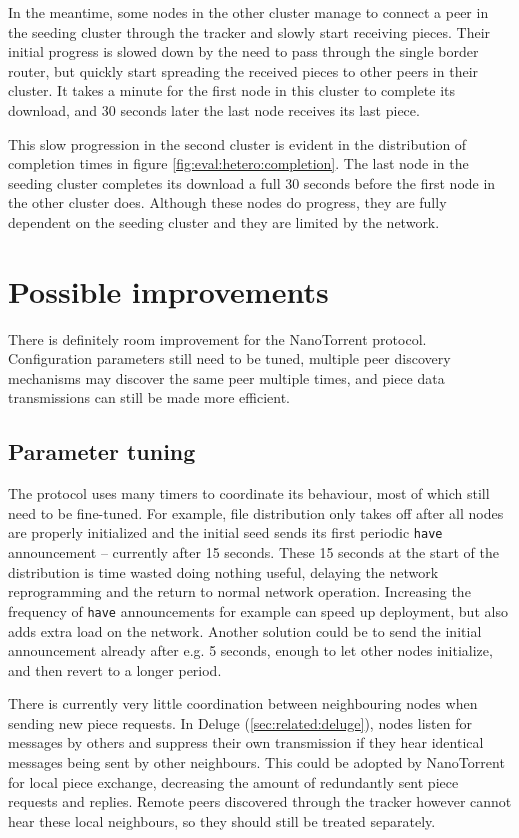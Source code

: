 In the meantime, some nodes in the other cluster manage to connect a peer in the seeding cluster through the tracker and slowly start receiving pieces. Their initial progress is slowed down by the need to pass through the single border router, but quickly start spreading the received pieces to other peers in their cluster. It takes a minute for the first node in this cluster to complete its download, and 30 seconds later the last node receives its last piece.

This slow progression in the second cluster is evident in the distribution of completion times in figure \ref{fig:eval:hetero:completion}. The last node in the seeding cluster completes its download a full 30 seconds before the first node in the other cluster does. Although these nodes do progress, they are fully dependent on the seeding cluster and they are limited by the network.

\section{Possible improvements}
\label{sec:eval:improvements}
There is definitely room improvement for the NanoTorrent protocol. Configuration parameters still need to be tuned, multiple peer discovery mechanisms may discover the same peer multiple times, and piece data transmissions can still be made more efficient.

\subsection{Parameter tuning}
The protocol uses many timers to coordinate its behaviour, most of which still need to be fine-tuned. For example, file distribution only takes off after all nodes are properly initialized and the initial seed sends its first periodic \texttt{have} announcement -- currently after 15 seconds. These 15 seconds at the start of the distribution is time wasted doing nothing useful, delaying the network reprogramming and the return to normal network operation. Increasing the frequency of \texttt{have} announcements for example can speed up deployment, but also adds extra load on the network. Another solution could be to send the initial announcement already after e.g. 5 seconds, enough to let other nodes initialize, and then revert to a longer period.

There is currently very little coordination between neighbouring nodes when sending new piece requests. In Deluge (\ref{sec:related:deluge}), nodes listen for messages by others and suppress their own transmission if they hear identical messages being sent by other neighbours. This could be adopted by NanoTorrent for local piece exchange, decreasing the amount of redundantly sent piece requests and replies. Remote peers discovered through the tracker however cannot hear these local neighbours, so they should still be treated separately.

